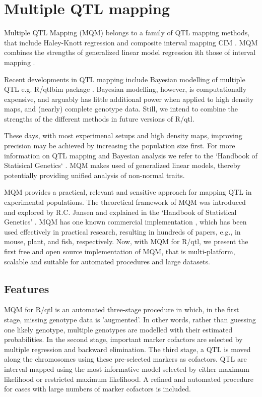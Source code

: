 \documentclass[8pt, twoside, a5paper]{report}
\begin{document}
\section{Multiple QTL mapping}

Multiple QTL Mapping (MQM) belongs to a family of QTL mapping methods, that include Haley-Knott regression
\cite{Haley:1992} and composite interval mapping CIM \cite{Zeng:1994}. MQM combines the strengths of generalized 
linear model regression ith those of interval mapping \cite{Jansen:1993, Jansen:1994b}. 

Recent developments in QTL mapping include Bayesian modelling of multiple QTL e.g. R/qtlbim package
\cite{Yandell:2007, Banerjee:2008}. Bayesian modelling, however, is computationally expensive, and arguably has 
little additional power when applied to high density maps, and (nearly) complete genotype data\cite{Handbook:Jansen:2007}. 
Still, we intend to combine the strengths of the different methods in future versions of R/qtl.

These days, with most experimenal setups and high density maps, improving precision may be achieved by increasing 
the population size first. For more information on QTL mapping and Bayesian analysis we refer to the `Handbook of 
Statisical Genetics` \cite{Handbook:2007}. MQM makes used of generalized linear models, thereby potentially 
providing unified analysis of non-normal traits.

MQM provides a practical, relevant and sensitive approach for mapping QTL in experimental populations. The 
theoretical framework of MQM was introduced and explored by R.C. Jansen\cite{Jansen:1994a} and explained in the 
`Handbook of Statistical Genetics' \cite{Handbook:Jansen:2007}. MQM has one known commercial implementation
\cite{Mapqtl:2002}, which has been used effectively in practical research, resulting in hundreds of papers, e.g., 
in mouse, plant, and fish, respectively\cite{DeMooij:2009, Jeuken:2009, Kitano:2009}.  Now, with MQM for R/qtl, 
we present the first free and open source implementation of MQM, that is multi-platform, scalable and suitable 
for automated procedures and large datasets.

\subsection{Features}
MQM for R/qtl is an automated three-stage procedure in which, in the first stage, missing genotype data is 'augmented'. 
In other words, rather than guessing one likely genotype, multiple genotypes are modelled with their estimated 
probabilities. In the second stage, important marker cofactors are selected by multiple regression and backward 
elimination. The third stage, a QTL is moved along the chromosomes using these pre-selected markers as cofactors. 
QTL are interval-mapped using the most informative model selected by either maximum likelihood or restricted maximum 
likelihood. A refined and automated procedure for cases with large numbers of marker cofactors is included. 
\end{document}
